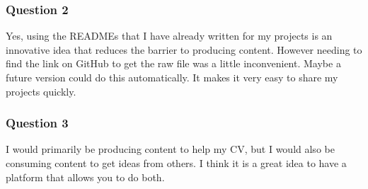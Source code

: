 \subsubsection{Question 2}
Yes, using the READMEs that I have already written for my projects is an innovative idea that reduces the barrier to producing content. However needing to find the link on GitHub to get the raw file was a little inconvenient. Maybe a future version could do this automatically. It makes it very easy to share my projects quickly.

\subsubsection{Question 3}
I would primarily be producing content to help my CV, but I would also be consuming content to get ideas from others. I think it is a great idea to have a platform that allows you to do both.

